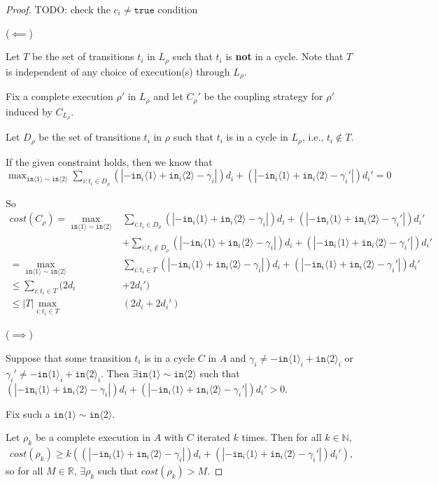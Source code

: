 \documentclass[12pt]{article}
\newcommand{\NN}{\mathbb{N}}
\newcommand{\RR}{\mathbb{R}}
\newcommand{\brangle}[1]{\langle #1 \rangle}
\theoremstyle{definition}
\begin{document}
\begin{proof}
    {\color{red} TODO: check the $c_i\neq \texttt{true}$ condition}

    ($\impliedby$)

    Let $T$ be the set of transitions $t_i$ in $L_\rho$ such that $t_i$ is \textbf{not} in a cycle. Note that $T$ is independent of any choice of execution(s) through $L_\rho$. 

    Fix a complete execution $\rho'$ in $L_\rho$ and let $C_\rho'$ be the coupling strategy for $\rho'$ induced by $C_{L_\rho}$. 

    Let $D_\rho$ be the set of transitions $t_i$ in $\rho$ such that $t_i$ is in a cycle in $L_\rho$, i.e., $t_i\notin T$.  

    If the given constraint holds, then we know that $\max_{\texttt{in}\brangle{1}\sim\texttt{in}\brangle{2}}\sum_{i: t_i\in D_\rho}(|-\texttt{in}_i\brangle{1}+\texttt{in}_i\brangle{2}-\gamma_i|)d_i+(|-\texttt{in}_i\brangle{1}+\texttt{in}_i\brangle{2}-\gamma_i'|)d_i' = 0$

    So \begin{align*}
        cost(C_\rho) = \max_{\texttt{in}\brangle{1}\sim\texttt{in}\brangle{2}}&\sum_{i: t_i\in D_\rho}(|-\texttt{in}_i\brangle{1}+\texttt{in}_i\brangle{2}-\gamma_i|)d_i+(|-\texttt{in}_i\brangle{1}+\texttt{in}_i\brangle{2}-\gamma_i'|)d_i'\\
        &+\sum_{i: t_i\notin D_\rho}(|-\texttt{in}_i\brangle{1}+\texttt{in}_i\brangle{2}-\gamma_i|)d_i+(|-\texttt{in}_i\brangle{1}+\texttt{in}_i\brangle{2}-\gamma_i'|)d_i'\\
        = \max_{\texttt{in}\brangle{1}\sim\texttt{in}\brangle{2}}&\sum_{i: t_i\in T}(|-\texttt{in}_i\brangle{1}+\texttt{in}_i\brangle{2}-\gamma_i|)d_i+(|-\texttt{in}_i\brangle{1}+\texttt{in}_i\brangle{2}-\gamma_i'|)d_i'\\
        \leq \sum_{i:t_i\in T}(2d_i& + 2d_i')\\
        \leq |T|\max_{i:t_i\in T}&(2d_i + 2d_i')
    \end{align*}

    ($\implies$)

    Suppose that some transition $t_i$ is in a cycle $C$ in $A$ and $\gamma_i\neq -\texttt{in}\brangle{1}_i+\texttt{in}\brangle{2}_i$ or $\gamma_i'\neq  -\texttt{in}\brangle{1}_i+\texttt{in}\brangle{2}_i$. Then $\exists \texttt{in}\brangle{1}\sim \texttt{in}\brangle{2}$ such that $(|-\texttt{in}_i\brangle{1}+\texttt{in}_i\brangle{2}-\gamma_i|)d_i+(|-\texttt{in}_i\brangle{1}+\texttt{in}_i\brangle{2}-\gamma_i'|)d_i'>0$.

    Fix such a $\texttt{in}\brangle{1}\sim \texttt{in}\brangle{2}$. 

    Let $\rho_k$ be a complete execution in $A$ with $C$ iterated $k$ times. Then for all $k\in \NN$, \begin{align*}
        cost(\rho_k) \geq k((|-\texttt{in}_i\brangle{1}+\texttt{in}_i\brangle{2}-\gamma_i|)d_i+(|-\texttt{in}_i\brangle{1}+\texttt{in}_i\brangle{2}-\gamma_i'|)d_i'),
    \end{align*}
    so for all $M\in \RR$, $\exists \rho_k$ such that $cost(\rho_k) > M$.
\end{proof}
\end{document}
